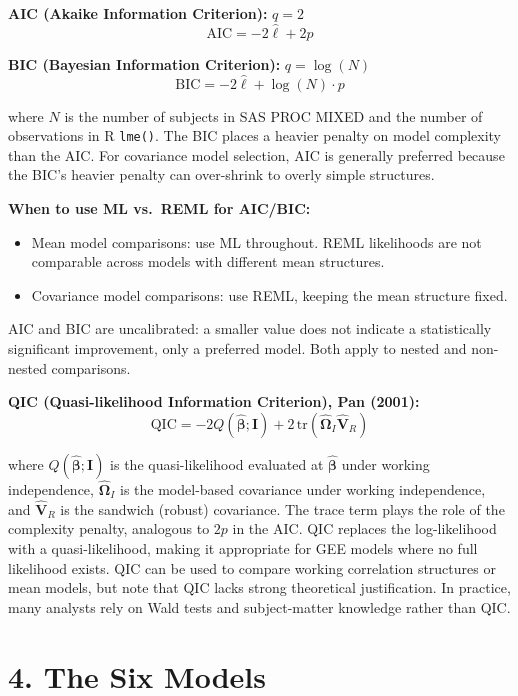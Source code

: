 \documentclass[11pt]{article}
\newcommand{\bbeta}{\boldsymbol{\beta}}
\begin{document}
\vspace{0.5em}

\textbf{AIC (Akaike Information Criterion):} $q = 2$
$$\text{AIC} = -2\hat{\ell} + 2p$$

\textbf{BIC (Bayesian Information Criterion):} $q = \log(N)$
$$\text{BIC} = -2\hat{\ell} + \log(N) \cdot p$$

where $N$ is the number of subjects in SAS PROC MIXED and the number of observations in R \texttt{lme()}. The BIC places a heavier penalty on model complexity than the AIC. For covariance model selection, AIC is generally preferred because the BIC's heavier penalty can over-shrink to overly simple structures.

\textbf{When to use ML vs.\ REML for AIC/BIC:}
\begin{itemize}[leftmargin=2em]
  \item Mean model comparisons: use ML throughout. REML likelihoods are not comparable across models with different mean structures.
  \item Covariance model comparisons: use REML, keeping the mean structure fixed.
\end{itemize}

AIC and BIC are uncalibrated: a smaller value does not indicate a statistically significant improvement, only a preferred model. Both apply to nested and non-nested comparisons.

\textbf{QIC (Quasi-likelihood Information Criterion), Pan (2001):}
$$\text{QIC} = -2Q(\hat{\bbeta}; \mathbf{I}) + 2\,\mathrm{tr}(\hat{\boldsymbol{\Omega}}_I \hat{\mathbf{V}}_R)$$

where $Q(\hat{\bbeta}; \mathbf{I})$ is the quasi-likelihood evaluated at $\hat{\bbeta}$ under working independence, $\hat{\boldsymbol{\Omega}}_I$ is the model-based covariance under working independence, and $\hat{\mathbf{V}}_R$ is the sandwich (robust) covariance. The trace term plays the role of the complexity penalty, analogous to $2p$ in the AIC. QIC replaces the log-likelihood with a quasi-likelihood, making it appropriate for GEE models where no full likelihood exists. QIC can be used to compare working correlation structures or mean models, but note that QIC lacks strong theoretical justification. In practice, many analysts rely on Wald tests and subject-matter knowledge rather than QIC.

\newpage

\section*{4. The Six Models}
\end{document}
